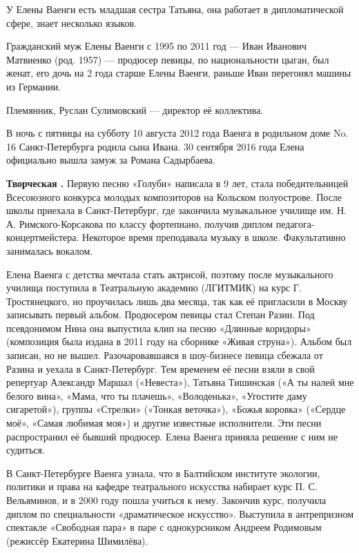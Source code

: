 У Елены Ваенги есть младшая сестра Татьяна, она работает в дипломатической сфере, знает несколько языков.

Гражданский муж Елены Ваенги  с 1995 по 2011 год --- Иван Иванович Матвиенко (род. 1957) --- продюсер певицы, по национальности цыган, был женат, его дочь на 2 года старше Елены Ваенги, раньше Иван перегонял машины из Германии.

Племянник, Руслан Сулимовский --- директор её коллектива.

В ночь с пятницы на субботу 10 августа 2012 года Ваенга в родильном доме No. 16 Санкт-Петербурга родила сына Ивана. 30 сентября 2016 года Елена официально вышла замуж за Романа Садырбаева.

\textbf{Творческая .} Первую песню «Голуби» написала в 9 лет, стала победительницей Всесоюзного конкурса молодых композиторов на Кольском полуострове. После школы приехала в Санкт-Петербург, где закончила музыкальное училище им. Н. А. Римского-Корсакова по классу фортепиано, получив диплом педагога-концертмейстера. Некоторое время преподавала музыку в школе. Факультативно занималась вокалом.

Елена Ваенга с детства мечтала стать актрисой, поэтому после музыкального училища поступила в Театральную академию (ЛГИТМИК) на курс Г. Тростянецкого, но проучилась лишь два месяца, так как её пригласили в Москву записывать первый альбом. Продюсером певицы стал Степан Разин. Под псевдонимом Нина она выпустила клип на песню «Длинные коридоры» (композиция была издана в 2011 году на сборнике «Живая струна»). Альбом был записан, но не вышел. Разочаровавшаяся в шоу-бизнесе певица сбежала от Разина и уехала в Санкт-Петербург. Тем временем её песни взяли в свой репертуар Александр Маршал («Невеста»), Татьяна Тишинская («А ты налей мне белого вина», «Мама, что ты плачешь», «Володенька», «Угостите даму сигаретой»), группы «Стрелки» («Тонкая веточка»), «Божья коровка» («Сердце моё», «Самая любимая моя») и другие известные исполнители. Эти песни распространил её бывший продюсер. Елена Ваенга приняла решение с ним не судиться.

В Санкт-Петербурге Ваенга узнала, что в Балтийском институте экологии, политики и права на кафедре театрального искусства набирает курс П. С. Вельяминов, и в 2000 году пошла учиться к нему. Закончив курс, получила диплом по специальности «драматическое искусство». Выступила в антрепризном спектакле «Свободная пара» в паре с однокурсником Андреем Родимовым (режиссёр Екатерина Шимилёва).

